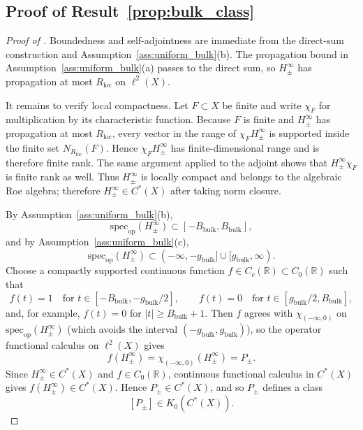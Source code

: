 \documentclass[11pt]{article}
\numberwithin{equation}{section}
\theoremstyle{definition}
\theoremstyle{remark}
\newcommand{\spec}{\mathrm{spec}}
\begin{document}
\subsection{Proof of Result~\ref{prop:bulk_class}}\label{app:proof:prop:bulk_class}
\begin{proof}[Proof of ]
Boundedness and self-adjointness are immediate from the direct-sum construction and
Assumption~\ref{ass:uniform_bulk}(b). The propagation bound in
Assumption~\ref{ass:uniform_bulk}(a) passes to the direct sum, so $H_\pm^\infty$ has propagation
at most $R_{\mathrm{loc}}$ on $\ell^2(X)$.

It remains to verify local compactness. Let $F\subset X$ be finite and write $\chi_F$ for
multiplication by its characteristic function. Because $F$ is finite and $H_\pm^\infty$ has
propagation at most $R_{\mathrm{loc}}$, every vector in the range of $\chi_F H_\pm^\infty$ is
supported inside the finite set $N_{R_{\mathrm{loc}}}(F)$. Hence $\chi_F H_\pm^\infty$ has
finite-dimensional range and is therefore finite rank. The same argument applied to the adjoint
shows that $H_\pm^\infty\chi_F$ is finite rank as well. Thus $H_\pm^\infty$ is locally compact and
belongs to the algebraic Roe algebra; therefore $H_\pm^\infty\in C^*(X)$ after taking norm closure.

By Assumption~\ref{ass:uniform_bulk}(b),
\[
\spec_{\mathrm{op}}(H_\pm^\infty)\subset [-B_{\mathrm{bulk}},B_{\mathrm{bulk}}],
\]
and by Assumption~\ref{ass:uniform_bulk}(c),
\[
\spec_{\mathrm{op}}(H_\pm^\infty)\subset (-\infty,-g_{\mathrm{bulk}}]\cup[g_{\mathrm{bulk}},\infty).
\]
Choose a compactly supported continuous function $f\in C_c(\mathbb R)\subset C_0(\mathbb R)$ such
that
\[
f(t)=1\quad\text{for }t\in[-B_{\mathrm{bulk}},-g_{\mathrm{bulk}}/2],
\qquad
f(t)=0\quad\text{for }t\in[g_{\mathrm{bulk}}/2,B_{\mathrm{bulk}}],
\]
and, for example, $f(t)=0$ for $|t|\ge B_{\mathrm{bulk}}+1$. Then $f$ agrees with
$\chi_{(-\infty,0)}$ on $\spec_{\mathrm{op}}(H_\pm^\infty)$ (which avoids the interval
$(-g_{\mathrm{bulk}},g_{\mathrm{bulk}})$), so the operator functional calculus on
$\ell^2(X)$ gives
\[
f(H_\pm^\infty)=\chi_{(-\infty,0)}(H_\pm^\infty)=P_\pm.
\]
Since $H_\pm^\infty\in C^*(X)$ and $f\in C_0(\mathbb R)$, continuous functional calculus in
$C^*(X)$ gives $f(H_\pm^\infty)\in C^*(X)$.
Hence $P_\pm\in C^*(X)$, and so $P_\pm$ defines a class
\[
[P_\pm]\in K_0(C^*(X)).
\]
\end{proof}
\end{document}
